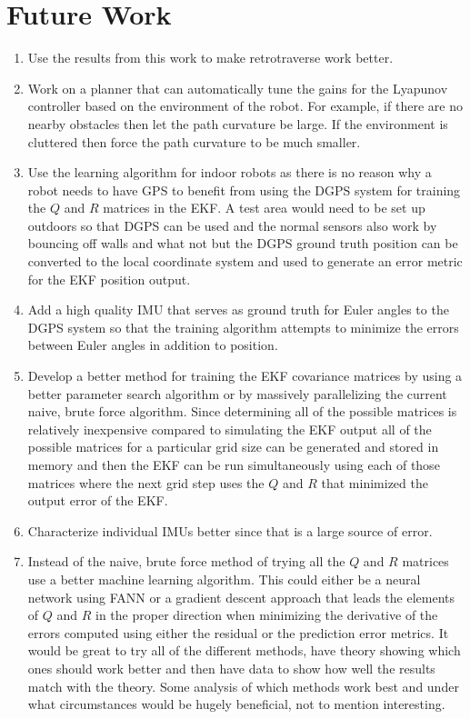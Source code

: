 \chapter{Future Work}
\label{ch:futurework}

\begin{enumerate}
\item Use the results from this work to make retrotraverse work better.
\item Work on a planner that can automatically tune the gains for the Lyapunov controller based on the environment of the robot. For example, if there are no nearby obstacles then let the path curvature be large. If the environment is cluttered then force the path curvature to be much smaller.
\item Use the learning algorithm for indoor robots as there is no reason why a robot needs to have GPS to benefit from using the DGPS system for training the $Q$ and $R$ matrices in the EKF. A test area would need to be set up outdoors so that DGPS can be used and the normal sensors also work by bouncing off walls and what not but the DGPS ground truth position can be converted to the local coordinate system and used to generate an error metric for the EKF position output.
\item Add a high quality IMU that serves as ground truth for Euler angles to the DGPS system so that the training algorithm attempts to minimize the errors between Euler angles in addition to position.
\item Develop a better method for training the EKF covariance matrices by using a better parameter search algorithm or by massively parallelizing the current naive, brute force algorithm. Since determining all of the possible matrices is relatively inexpensive compared to simulating the EKF output all of the possible matrices for a particular grid size can be generated and stored in memory and then the EKF can be run simultaneously using each of those matrices where the next grid step uses the $Q$ and $R$ that minimized the output error of the EKF.
\item Characterize individual IMUs better since that is a large source of error.
\item Instead of the naive, brute force method of trying all the $Q$ and $R$ matrices use a better machine learning algorithm. This could either be a neural network using FANN or a gradient descent approach that leads the elements of $Q$ and $R$ in the proper direction when minimizing the derivative of the errors computed using either the residual or the prediction error metrics. It would be great to try all of the different methods, have theory showing which ones should work better and then have data to show how well the results match with the theory. Some analysis of which methods work best and under what circumstances would be hugely beneficial, not to mention interesting.

\end{enumerate}
